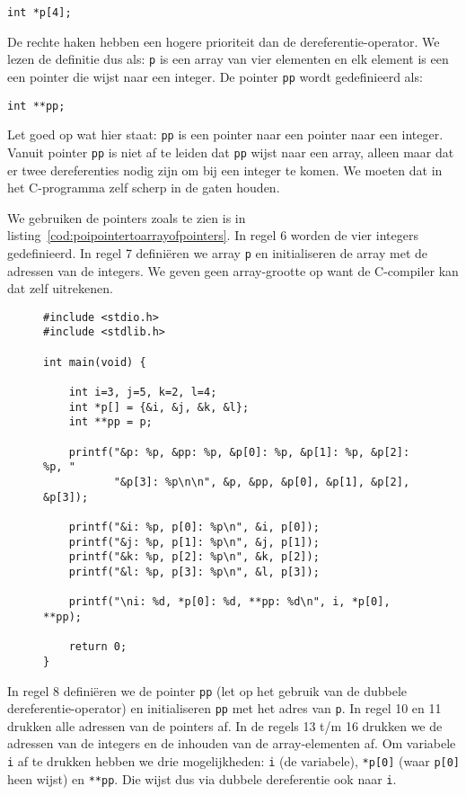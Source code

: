 \hspace*{1em}\texttt{int *p[4];}

De rechte haken hebben een hogere prioriteit dan de dereferentie-operator. We lezen de definitie dus als: \texttt{p} is een array van vier elementen en elk element is een een pointer die wijst naar een integer. De pointer \texttt{pp} wordt gedefinieerd als:

\hspace*{1em}\texttt{int **pp;}

Let goed op wat hier staat: \texttt{pp} is een pointer naar een pointer naar een integer. Vanuit pointer \texttt{pp} is niet af te leiden dat \texttt{pp} wijst naar een array, alleen maar dat er twee dereferenties nodig zijn om bij een integer te komen. We moeten dat in het C-programma zelf scherp in de gaten houden.

We gebruiken de pointers zoals te zien is in listing~\ref{cod:poipointertoarrayofpointers}. In regel 6 worden de vier integers gedefinieerd. In regel 7 definiëren we array \texttt{p} en initialiseren de array met de adressen van de integers. We geven geen array-grootte op want de C-compiler kan dat zelf uitrekenen.

\begin{figure}[!ht]
\begin{lstlisting}[caption=Voorbeeld van het gebruik van pointers.,label=cod:poipointertoarrayofpointers]
#include <stdio.h>
#include <stdlib.h>

int main(void) {

    int i=3, j=5, k=2, l=4;
    int *p[] = {&i, &j, &k, &l};
    int **pp = p;

    printf("&p: %p, &pp: %p, &p[0]: %p, &p[1]: %p, &p[2]: %p, "
           "&p[3]: %p\n\n", &p, &pp, &p[0], &p[1], &p[2], &p[3]);

    printf("&i: %p, p[0]: %p\n", &i, p[0]);
    printf("&j: %p, p[1]: %p\n", &j, p[1]);
    printf("&k: %p, p[2]: %p\n", &k, p[2]);
    printf("&l: %p, p[3]: %p\n", &l, p[3]);

    printf("\ni: %d, *p[0]: %d, **pp: %d\n", i, *p[0], **pp);

    return 0;
}
\end{lstlisting}
\end{figure}

In regel 8 definiëren we de pointer \texttt{pp} (let op het gebruik van de dubbele dereferentie-operator) en initialiseren \texttt{pp} met het adres van \texttt{p}. In regel 10 en 11 drukken alle adressen van de pointers af. In de regels 13 t/m 16 drukken we de adressen van de integers en de inhouden van de array-elementen af. Om variabele \texttt{i} af te drukken hebben we drie mogelijkheden: \texttt{i} (de variabele), \texttt{*p[0]} (waar \texttt{p[0]} heen wijst) en \texttt{**pp}. Die wijst dus via dubbele dereferentie ook naar \texttt{i}.


